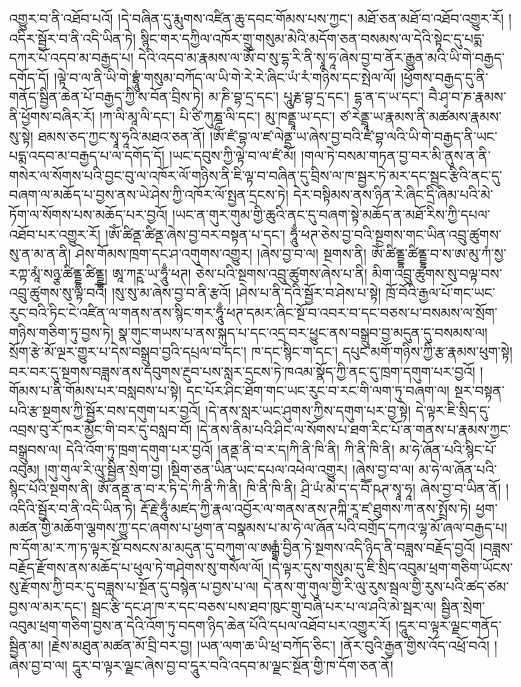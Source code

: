 འགྱུར་བ་ནི་འཐོབ་པའོ། །དེ་བཞིན་དུ་རྨུགས་འཛིན་ཆུ་དབང་གོམས་པས་ཀྱང་། མཐོ་ཅན་མཐོ་བ་འཐོབ་འགྱུར་རོ། །འདིར་སྦྱོར་བ་ནི་འདི་ཡིན་ཏེ། སྙིང་གར་དཀྱིལ་འཁོར་གྲུ་གསུམ་མེའི་མདོག་ཅན་བསམས་ལ་དེའི་སྟེང་དུ་པདྨ་དཀར་པོ་འདབ་མ་བརྒྱད་པ། དེའི་འདབ་མ་རྣམས་ལ་ཨོཾ་བ་སུ་དྷ་རི་ནི་སྭཱ་ཧཱ་ཞེས་བྱ་བ་ནོར་རྒྱུན་མའི་ཡི་གེ་བརྒྱད་དགོད་དོ། །ལྟེ་བ་ལ་ནི་ཡི་གེ་བྷྲཱུཾ་གསུམ་བཀོད་ལ་ཡི་གེ་རེ་རེ་ཞིང་ཡཾ་རཾ་གཉིས་དང་སྤེལ་ལོ། །ཕྱོགས་བརྒྱད་དུ་ནི་གནོད་སྦྱིན་ཆེན་པོ་བརྒྱད་ཀྱི་ས་བོན་བྲིས་ཏེ། མ་ཎི་བྷ་དྲ་དང་། པཱུརྞ་བྷ་དྲ་དང་། དྷ་ན་ད་ཡ་དང་། བཻ་ཤྭ་བ་ཎ་རྣམས་ནི་ཕྱོགས་བཞིར་རོ། །ཀ་ལི་མཱ་ལི་དང་། པི་ཙི་ཀུཎྜ་ལི་དང་། མུ་ཁནྡྲཱ་ཡ་དང་། ཙ་རེནྡྲཱ་ཡ་རྣམས་ནི་མཚམས་རྣམས་སུ་སྟེ། ཐམས་ཅད་ཀྱང་སྭཱ་ཧཱའི་མཐའ་ཅན་ནོ། །ཨོཾ་ཛཾ་བྷ་ལ་ཛ་ལེནྡྲ་ཡ་ཞེས་བྱ་བའི་ཛཾ་བྷ་ལའི་ཡི་གེ་བརྒྱད་ནི་ཡང་པདྨ་འདབ་མ་བརྒྱད་པ་ལ་དགོད་དོ། །ཡང་དབུས་ཀྱི་ལྟེ་བ་ལ་ཛཾ་མོ། །གལ་ཏེ་བསམ་གཏན་བྱ་བར་མི་ནུས་ན་ནི་གསེར་ལ་སོགས་པའི་བྱང་བུ་ལ་འཁོར་ལོ་གཉིས་ནི་ཇི་ལྟ་བ་བཞིན་དུ་བྲིས་ལ་ཁ་སྦྱར་ཏེ་མར་དང་སྦྲང་རྩིའི་ནང་དུ་བཞག་ལ་མཆོད་པ་བྱས་ནས་ཡེ་ཤེས་ཀྱི་འཁོར་ལོ་སྤྱན་དྲངས་ཏེ། དེར་བསྟིམས་ནས་ཉིན་རེ་ཞིང་དྲི་ཞིམ་པའི་མེ་ཏོག་ལ་སོགས་པས་མཆོད་པར་བྱའོ། །ཡང་ན་གུར་གུམ་གྱི་ཆུའི་ནང་དུ་བཞག་སྟེ་མཆོད་ན་མཐོ་རིས་ཀྱི་དཔལ་འཐོབ་པར་འགྱུར་རོ། །ཨོཾ་ཚིནྡ་ཚིནྡ་ཞེས་བྱ་བར་བསྟན་པ་དང་། ཧཱུྃ་ཕཊ་ཅེས་བྱ་བའི་སྔགས་གང་ཡིན་འབྲུ་ཚུགས་སུ་ན་མ་ན་ནི། ཤེས་གོམས་ཁྲག་དང་ཤ་འགུགས་འགྱུར། །ཞེས་བྱ་བ་ལ། སྔགས་ནི། ཨོཾ་ཚིནྡྷ་ཚིནྡྷ་བ་ས་ཨ་མུ་ཀཾ་སྱ་རཀྟ་མཱཾ་སཉྩ་ཚིནྡྷ་ཚིནྡྷ། ཨཱ་ཀཪྵ་ཡ་ཧཱུྃ་ཕཊ། ཅེས་པའི་སྔགས་འབྲུ་ཚུགས་ཞེས་པ་ནི། མིག་འབྲུ་ཚུགས་སུ་བལྟ་བས་འབྲུ་ཚུགས་སུ་ལྟ་བའོ། །སུ་སུ་མ་ཞེས་བྱ་བ་ནི་རྩའོ། །ཤེས་པ་ནི་དེའི་སྦྱོར་བ་ཤེས་པ་སྟེ། ཁྲོ་བོའི་རྒྱལ་པོ་གང་ཡང་རུང་བའི་ཏིང་ངེ་འཛིན་ལ་གནས་ནས་སྙིང་གར་ཧཱུྃ་ཕཊ་དམར་ཞིང་སྔོ་བ་འབར་བ་དང་བཅས་པ་བསམས་ལ་སྲོག་གཉིས་གཅིག་ཏུ་བྱས་ཏེ། སྣ་གུང་གཡས་པ་ནས་སྐུད་པ་དང་འདྲ་བར་ཕྱུང་ནས་བསྒྲུབ་བྱ་མདུན་དུ་བསམས་ལ། སྲོག་རྩེ་མོ་ལྔར་གྱུར་པ་དེས་བསྒྲུབ་བྱའི་དཔྲལ་བ་དང་། ཁ་དང་སྙིང་ག་དང་། དཔུང་མགོ་གཉིས་ཀྱི་རྩ་རྣམས་ཕུག་སྟེ། བར་བར་དུ་སྔགས་བཟླས་ནས་དབུགས་རྔུབ་པས་སླར་དྲངས་ཏེ་ཁའམ་སྣོད་ཀྱི་ནང་དུ་ཁྲག་དགུག་པར་བྱའོ། །གོམས་པ་ནི་གོམས་པར་བསླབས་པ་སྟེ། དང་པོར་ཤིང་ཐོག་གང་ཡང་རུང་བ་རང་གི་ལག་ཏུ་བཞག་ལ། སྔར་བསྟན་པའི་རྩ་སྔགས་ཀྱི་སྦྱོར་བས་དགུག་པར་བྱའོ། །དེ་ནས་སླར་ཡང་ཤུགས་ཀྱིས་དགུག་པར་བྱ་སྟེ། དེ་ལྟར་ཇི་སྲིད་དུ་འབྲས་བུ་རོ་ཁར་མྱོང་གི་བར་དུ་བསླབ་བོ། །དེ་ནས་ནིམ་པའི་ཤིང་ལ་སོགས་པ་ཐག་རིང་པོ་ན་གནས་པ་རྣམས་ཀྱང་བསྒྲུབས་ལ། དེའི་འོག་ཏུ་ཁྲག་དགུག་པར་བྱའོ། །ནནྡ་ནི་བ་ར་ད།ཀི་ནི་ཁི་ནི། ཀི་ནི་ཁི་ནི། མ་ཧེ་ཞོན་པའི་སྙིང་པོ་འབུམ། །གུ་གུལ་རི་ལུ་སྦྱིན་སྲེག་བྱ། །སྡིག་ཅན་ཡིན་ཡང་དཔལ་འཕེལ་འགྱུར། །ཞེས་བྱ་བ་ལ། མ་ཧེ་ལ་ཞོན་པའི་སྙིང་པོའི་སྔགས་ནི། ཨོཾ་ནནྡ་ན་བ་ར་ཏི་དེ་ཀི་ནི་ཀི་ནི། ཁི་ནི་ཁི་ནི། ཤྲི་ཡཾ་མེ་ད་ད་བཽ་ཥཊ་སྭཱ་ཧཱ། ཞེས་བྱ་བ་ཡིན་ནོ། །འདིའི་སྦྱོར་བ་ནི་འདི་ཡིན་ཏེ། རྡོ་རྗེ་ཧཱུྃ་མཛད་ཀྱི་རྣལ་འབྱོར་ལ་གནས་ནས་ཊཀྐི་རཱ་ཛ་ཐུགས་ཀ་ནས་སྤྲོས་ཏེ། ཕྱག་མཚན་གྱི་མཆོག་ལྕགས་ཀྱུ་དང་ཞགས་པ་ཕྱག་ན་བསྣམས་པ་མ་ཧེ་ལ་ཞོན་པའི་བགྲོད་དཀའ་ལྷ་མོ་ཞལ་བརྒྱད་པ། ཁ་དོག་མ་ར་ཀ་ཏ་ལྟར་སྔོ་བསངས་མ་མདུན་དུ་བཀུག་ལ་ཨརྒྷཾ་བྱིན་ཏེ་སྔགས་འདི་ཉིད་ནི་བཟླས་བརྗོད་བྱའོ། །བཟླས་བརྗོད་རྫོགས་ནས་མཆོད་པ་ཕུལ་ཏེ་གཤེགས་སུ་གསོལ་ལོ། །དེ་ལྟར་དུས་གསུམ་དུ་ཇི་སྲིད་འབུམ་ཕྲག་གཅིག་ཡོངས་སུ་རྫོགས་ཀྱི་བར་དུ་བཟླས་པ་སྔོན་དུ་བསྙེན་པ་བྱས་པ་ལ། དེ་ནས་གུ་གུལ་གྱི་རི་ལུ་རུས་སྦལ་གྱི་རུས་པའི་ཚད་ཙམ་བྱས་ལ་མར་དང་། སྦྲང་རྩི་དང་ཤ་ཁ་ར་དང་བཅས་པས་ཐབ་ཁུང་གྲུ་བཞི་པར་པ་ལ་ཤའི་མེ་སྦར་ལ། སྦྱིན་སྲེག་འབུམ་ཕྲག་གཅིག་བྱས་ན་དེའི་འོག་ཏུ་བདག་ཉིད་ཆེན་པོའི་དཔལ་འཐོབ་པར་འགྱུར་རོ། །དཱུར་བ་ལྟར་ལྗང་གནོད་སྦྱིན་མ། །རྗེས་མཐུན་མཚན་མོ་བྲི་བར་བྱ། །ཡན་ལག་ཆ་ཡི་ཕྲ་བཀོད་ཅིང་། །ནོར་བུའི་རྒྱན་གྱིས་འོད་འཕྲོ་བའོ། །ཞེས་བྱ་བ་ལ། དཱུར་བ་ལྟར་ལྗང་ཞེས་བྱ་བ་དཱུར་བའི་འདབ་མ་ལྗང་སྔོན་གྱི་ཁ་དོག་ཅན་ནོ། 
